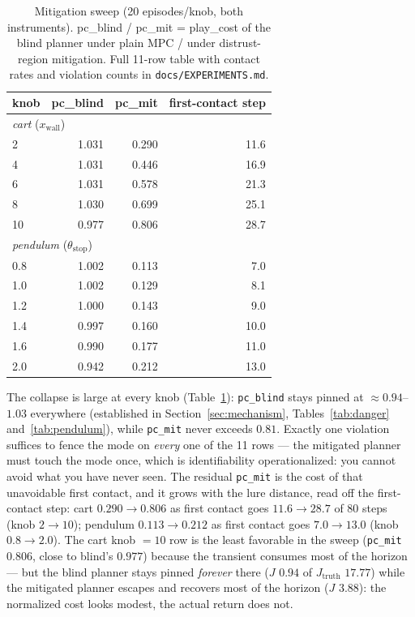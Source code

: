 \documentclass[11pt]{article}
\theoremstyle{definition}
\theoremstyle{remark}
\begin{document}
\begin{table}[ht]
\centering
\small
\begin{tabular}{lrrr}
\toprule
knob & pc\_blind & pc\_mit & first-contact step \\
\midrule
\multicolumn{4}{l}{\emph{cart} ($x_\mathrm{wall}$)} \\
2  & 1.031 & 0.290 & 11.6 \\
4  & 1.031 & 0.446 & 16.9 \\
6  & 1.031 & 0.578 & 21.3 \\
8  & 1.030 & 0.699 & 25.1 \\
10 & 0.977 & 0.806 & 28.7 \\
\multicolumn{4}{l}{\emph{pendulum} ($\theta_\mathrm{stop}$)} \\
0.8 & 1.002 & 0.113 & 7.0 \\
1.0 & 1.002 & 0.129 & 8.1 \\
1.2 & 1.000 & 0.143 & 9.0 \\
1.4 & 0.997 & 0.160 & 10.0 \\
1.6 & 0.990 & 0.177 & 11.0 \\
2.0 & 0.942 & 0.212 & 13.0 \\
\bottomrule
\end{tabular}
\caption{Mitigation sweep (20 episodes/knob, both instruments). pc\_blind / pc\_mit = play\_cost of the blind planner under plain MPC / under distrust-region mitigation. Full 11-row table with contact rates and violation counts in \texttt{docs/EXPERIMENTS.md}.}
\label{tab:mitigation}
\end{table}

The collapse is large at every knob (Table~\ref{tab:mitigation}): \texttt{pc\_blind} stays pinned at $\approx 0.94$--$1.03$ everywhere (established in Section~\ref{sec:mechanism}, Tables~\ref{tab:danger} and~\ref{tab:pendulum}), while \texttt{pc\_mit} never exceeds $0.81$. Exactly one violation suffices to fence the mode on \emph{every} one of the 11 rows --- the mitigated planner must touch the mode once, which is identifiability operationalized: you cannot avoid what you have never seen. The residual \texttt{pc\_mit} is the cost of that unavoidable first contact, and it grows with the lure distance, read off the first-contact step: cart $0.290 \to 0.806$ as first contact goes $11.6 \to 28.7$ of 80 steps (knob $2 \to 10$); pendulum $0.113 \to 0.212$ as first contact goes $7.0 \to 13.0$ (knob $0.8 \to 2.0$). The cart knob $=10$ row is the least favorable in the sweep (\texttt{pc\_mit} $0.806$, close to blind's $0.977$) because the transient consumes most of the horizon --- but the blind planner stays pinned \emph{forever} there ($J$ $0.94$ of $J_\mathrm{truth}$ $17.77$) while the mitigated planner escapes and recovers most of the horizon ($J$ $3.88$): the normalized cost looks modest, the actual return does not.
\end{document}
